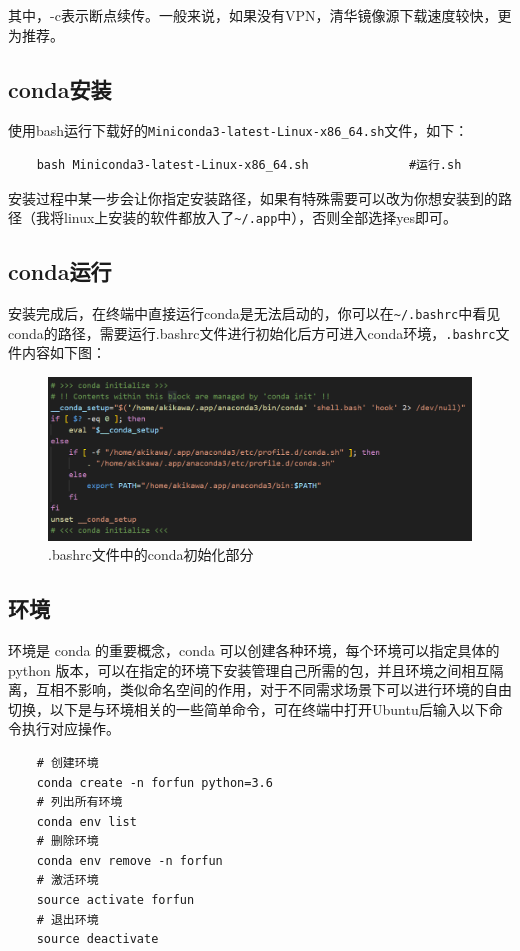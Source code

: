 其中，-c表示断点续传。一般来说，如果没有VPN，清华镜像源下载速度较快，更为推荐。

\subsection{conda安装}
使用bash运行下载好的\lstinline{Miniconda3-latest-Linux-x86_64.sh}文件，如下：
\begin{lstlisting}
    bash Miniconda3-latest-Linux-x86_64.sh              #运行.sh 
\end{lstlisting}

安装过程中某一步会让你指定安装路径，如果有特殊需要可以改为你想安装到的路径（我将linux上安装的软件都放入了\lstinline{~/.app}中），否则全部选择yes即可。

\subsection{conda运行}
安装完成后，在终端中直接运行conda是无法启动的，你可以在\lstinline{~/.bashrc}中看见conda的路径，需要运行.bashrc文件进行初始化后方可进入conda环境，\lstinline{.bashrc}文件内容如下图：

\begin{figure}[ht]
    \centering
    \includegraphics[width=13cm]{image/env/conda-initiate.png}
    \caption{.bashrc文件中的conda初始化部分}
\end{figure}

\subsection{环境}
环境是 conda 的重要概念，conda 可以创建各种环境，每个环境可以指定具体的 python 版本，可以在指定的环境下安装管理自己所需的包，并且环境之间相互隔离，互相不影响，类似命名空间的作用，对于不同需求场景下可以进行环境的自由切换，以下是与环境相关的一些简单命令，可在终端中打开Ubuntu后输入以下命令执行对应操作。
\begin{lstlisting}
    # 创建环境
    conda create -n forfun python=3.6
    # 列出所有环境
    conda env list
    # 删除环境
    conda env remove -n forfun
    # 激活环境
    source activate forfun
    # 退出环境
    source deactivate
\end{lstlisting}

